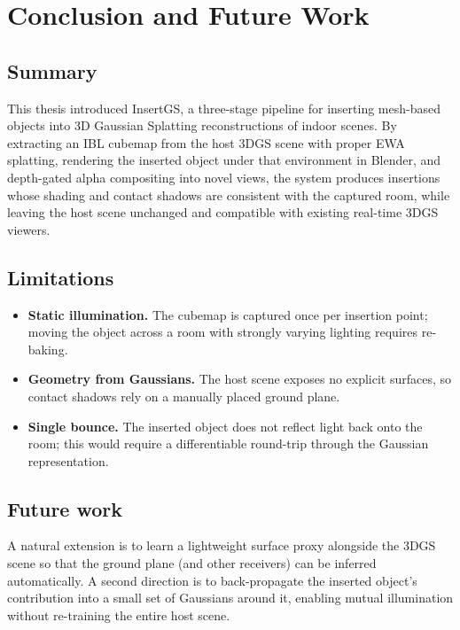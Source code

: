 
\chapter{Conclusion and Future Work}\label{chapter:conclusion}

\section{Summary}

This thesis introduced InsertGS, a three-stage pipeline for inserting
mesh-based objects into 3D Gaussian Splatting reconstructions of indoor
scenes. By extracting an IBL cubemap from the host 3DGS scene with proper
EWA splatting, rendering the inserted object under that environment in
Blender, and depth-gated alpha compositing into novel views, the system
produces insertions whose shading and contact shadows are consistent with
the captured room, while leaving the host scene unchanged and compatible
with existing real-time 3DGS viewers.

\section{Limitations}

\begin{itemize}
  \item \textbf{Static illumination.} The cubemap is captured once per
        insertion point; moving the object across a room with strongly
        varying lighting requires re-baking.
  \item \textbf{Geometry from Gaussians.} The host scene exposes no
        explicit surfaces, so contact shadows rely on a manually placed
        ground plane.
  \item \textbf{Single bounce.} The inserted object does not reflect light
        back onto the room; this would require a differentiable round-trip
        through the Gaussian representation.
\end{itemize}

\section{Future work}

A natural extension is to learn a lightweight surface proxy alongside the
3DGS scene so that the ground plane (and other receivers) can be inferred
automatically. A second direction is to back-propagate the inserted
object's contribution into a small set of Gaussians around it, enabling
mutual illumination without re-training the entire host scene.
